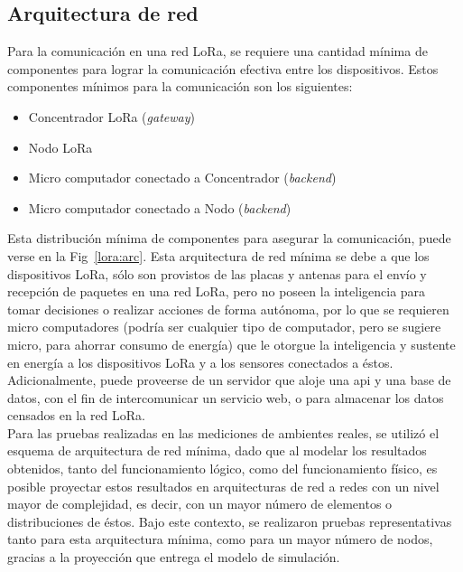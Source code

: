\begin{justify}
\subsection{Arquitectura de red}
Para la comunicación en una red LoRa, se requiere una cantidad mínima de componentes para lograr la comunicación efectiva entre los dispositivos. Estos componentes mínimos para la comunicación son los siguientes:\\
\begin{itemize}
\item Concentrador LoRa (\textit{gateway})
\item Nodo LoRa
\item Micro computador conectado a Concentrador (\textit{backend})
\item Micro computador conectado a Nodo (\textit{backend})
\end{itemize}
Esta distribución mínima de componentes para asegurar la comunicación, puede verse en la Fig~\ref{lora:arc}. Esta arquitectura de red mínima se debe a que los dispositivos LoRa, sólo son provistos de las placas y antenas para el envío y recepción de paquetes en una red LoRa, pero no poseen la inteligencia para tomar decisiones o realizar acciones de forma autónoma, por lo que se requieren micro computadores (podría ser cualquier tipo de computador, pero se sugiere micro, para ahorrar consumo de energía) que le otorgue la inteligencia y sustente en energía a los dispositivos LoRa y a los sensores conectados a éstos. Adicionalmente, puede proveerse de un servidor que aloje una \gls{api} y una base de datos, con el fin de intercomunicar un servicio web, o para almacenar los datos censados en la red LoRa.\\
Para las pruebas realizadas en las mediciones de ambientes reales, se utilizó el esquema de arquitectura de red mínima, dado que al modelar los resultados obtenidos, tanto del funcionamiento lógico, como del funcionamiento físico, es posible proyectar estos resultados en arquitecturas de red a redes con un nivel mayor de complejidad, es decir, con un mayor número de elementos o distribuciones de éstos. Bajo este contexto, se realizaron pruebas representativas tanto para esta arquitectura mínima, como para un mayor número de nodos, gracias a la proyección que entrega el modelo de simulación.
\begin{figure}[!ht]
\centering

\end{figure}
\end{justify}

